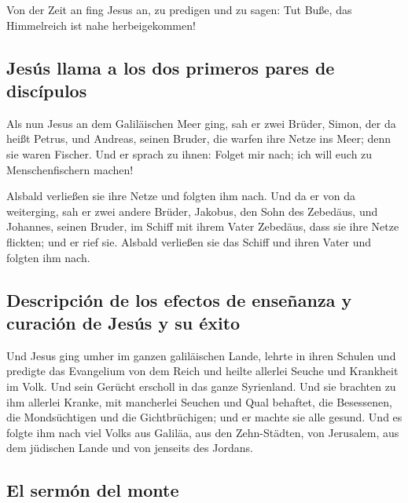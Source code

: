  Von der Zeit an fing Jesus an, zu predigen und zu sagen:
Tut Buße, das Himmelreich ist nahe herbeigekommen!

\hypertarget{jesuxfas-llama-a-los-dos-primeros-pares-de-discuxedpulos}{%
\subsection{Jesús llama a los dos primeros pares de
discípulos}\label{jesuxfas-llama-a-los-dos-primeros-pares-de-discuxedpulos}}

 Als nun Jesus an dem Galiläischen Meer ging, sah er zwei
Brüder, Simon, der da heißt Petrus, und Andreas, seinen Bruder, die
warfen ihre Netze ins Meer; denn sie waren Fischer.  Und
er sprach zu ihnen: Folget mir nach; ich will euch zu Menschenfischern
machen!

 Alsbald verließen sie ihre Netze und folgten ihm nach.
 Und da er von da weiterging, sah er zwei andere Brüder,
Jakobus, den Sohn des Zebedäus, und Johannes, seinen Bruder, im Schiff
mit ihrem Vater Zebedäus, dass sie ihre Netze flickten; und er rief sie.
 Alsbald verließen sie das Schiff und ihren Vater und
folgten ihm nach.

\hypertarget{descripciuxf3n-de-los-efectos-de-enseuxf1anza-y-curaciuxf3n-de-jesuxfas-y-su-uxe9xito}{%
\subsection{Descripción de los efectos de enseñanza y curación de Jesús
y su
éxito}\label{descripciuxf3n-de-los-efectos-de-enseuxf1anza-y-curaciuxf3n-de-jesuxfas-y-su-uxe9xito}}

 Und Jesus ging umher im ganzen galiläischen Lande,
lehrte in ihren Schulen und predigte das Evangelium von dem Reich und
heilte allerlei Seuche und Krankheit im Volk.  Und sein
Gerücht erscholl in das ganze Syrienland. Und sie brachten zu ihm
allerlei Kranke, mit mancherlei Seuchen und Qual behaftet, die
Besessenen, die Mondsüchtigen und die Gichtbrüchigen; und er machte sie
alle gesund.  Und es folgte ihm nach viel Volks aus
Galiläa, aus den Zehn-Städten, von Jerusalem, aus dem jüdischen Lande
und von jenseits des Jordans.

\hypertarget{el-sermuxf3n-del-monte}{%
\subsection{El sermón del monte}\label{el-sermuxf3n-del-monte}}


